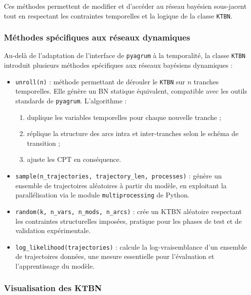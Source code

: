 \documentclass{article}
\begin{document}
Ces méthodes permettent de modifier et d'accéder au réseau bayésien sous-jacent tout en respectant les contraintes
temporelles et la logique de la classe \texttt{KTBN}.


\subsubsection{Méthodes spécifiques aux réseaux dynamiques}

Au-delà de l'adaptation de l'interface de \texttt{pyagrum} à la temporalité, la classe \texttt{KTBN} introduit
plusieurs méthodes spécifiques aux réseaux bayésiens dynamiques :

\begin{itemize}
    \item \texttt{unroll(n)} : méthode permettant de dérouler le \texttt{KTBN} sur $n$ tranches temporelles.
          Elle génère un BN statique équivalent, compatible avec les outils standards de
          \texttt{pyagrum}. L'algorithme :
          \begin{enumerate}
              \item duplique les variables temporelles pour chaque nouvelle tranche ;
              \item réplique la structure des arcs intra et inter-tranches selon le schéma de transition ;
              \item ajuste les CPT en conséquence.
          \end{enumerate}
    \item \texttt{sample(n\_trajectories, trajectory\_len, processes)} : génère un ensemble de trajectoires
          aléatoires à partir du modèle, en exploitant la parallélisation via le module
          \texttt{multiprocessing} de Python.
    \item \texttt{random(k, n\_vars, n\_mods, n\_arcs)} : crée un KTBN aléatoire respectant les contraintes
          structurelles imposées, pratique pour les phases de test et de validation expérimentale.
    \item \texttt{log\_likelihood(trajectories)} : calcule la log-vraisemblance d'un ensemble de trajectoires
          données, une mesure essentielle pour l'évaluation et l'apprentissage du modèle.
\end{itemize}


\subsubsection{Visualisation des KTBN}
\end{document}
